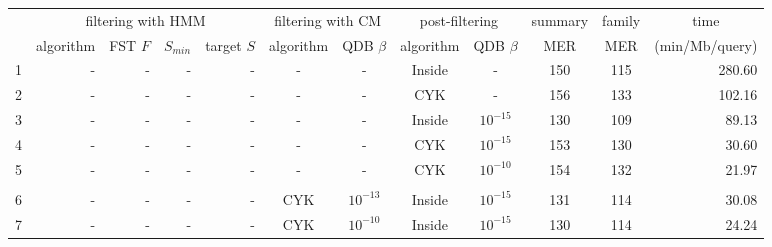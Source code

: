 \begin{tabular}{r|r|rr|r|cc|cc|c|c|r} 
  & \multicolumn{4}{c|}{filtering with HMM}  & \multicolumn{2}{c|}{filtering with CM}  & \multicolumn{2}{c|}{post-filtering}& summary & family & \multicolumn{1}{c}{time} \\ %
  \cline{2-9} 
  & algorithm & FST $F$& $S_{min}$ & target $S$ & algorithm & QDB $\beta$ & algorithm & QDB  $\beta$           & MER     & MER    & (min/Mb/query) \\ \hline %
1 & - & -      &    - &    -             & - & -           & Inside    & -                                    & 150     & 115    & 280.60 \\               %
2 & - & -      &    - &    -             & - & -           & CYK       & -                                    & 156     & 133    & 102.16 \\ %
3 & - & -      &    - &    -             & - & -           & Inside    & $10^{-15}$                           & 130     & 109    &  89.13\\ %
4 & - & -      &    - &    -             & - & -           & CYK       & $10^{-15}$                           & 153     & 130    &  30.60\\ %
5 & - & -      &    - &    -             & - & -             & CYK       & $10^{-10}$                          & 154     & 132    &  21.97\\ %
& & & & & & & & & & & \\
6 & - & -      &    - &    -             & CYK & $10^{-13}$   & Inside    & $10^{-15}$                         & 131     & 114    &  30.08\\ %
7 & - & -      &    - &    -             & CYK & $10^{-10}$   & Inside    & $10^{-15}$                         & 130     & 114    &  24.24\\ %

\end{tabular}
